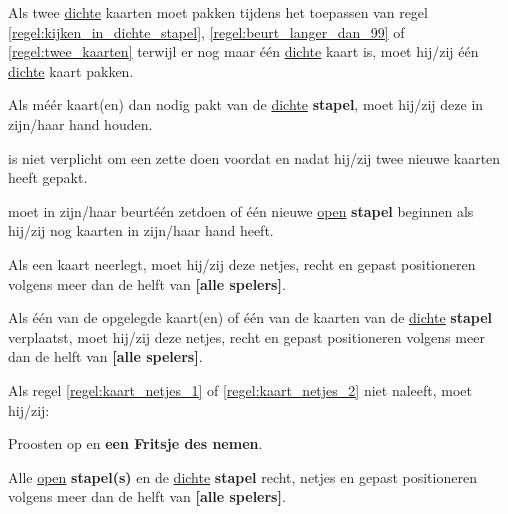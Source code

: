 \vervolgLijst{}
    \item Als \eenSpeler twee \ul{dichte} kaarten moet pakken tijdens het toepassen van regel \ref{regel:kijken_in_dichte_stapel}, \ref{regel:beurt_langer_dan_99} of \ref{regel:twee_kaarten} terwijl er nog maar \'e\'en \ul{dichte} kaart is, moet hij/zij \'e\'en \ul{dichte} kaart pakken.
    \label{item:geen_kaart_2}
\eindLijst{}

\vervolgLijst{}
    \item Als \eenSpeler méér kaart(en) dan nodig pakt van de \ul{dichte} \textbf{stapel}, moet hij/zij deze in zijn/haar hand houden.
\eindLijst{}

\vervolgLijst{}
    \item \EenSpeler is niet verplicht om een zet\footnotemark[3] te doen voordat en nadat hij/zij twee nieuwe kaarten heeft gepakt.
\eindLijst{}

\vervolgLijst{}
    \item \EenSpeler moet in zijn/haar beurt\footnotemark[1] \'e\'en zet\footnotemark[3] doen of \'e\'en nieuwe \ul{open} \textbf{stapel} beginnen als hij/zij nog kaarten in zijn/haar hand heeft.
\eindLijst{}


\newpage
{}


\vervolgLijst{}
    \item Als \eenSpeler een kaart neerlegt, moet hij/zij deze netjes, recht en gepast positioneren volgens meer dan de helft van \textbf{[alle spelers]}.
    \label{regel:kaart_netjes_1}
\eindLijst{}

\vervolgLijst{}
    \item Als \eenSpeler één van de opgelegde kaart(en) of één van de kaarten van de \ul{dichte} \textbf{stapel} verplaatst, moet hij/zij deze netjes, recht en gepast positioneren volgens meer dan de helft van \textbf{[alle spelers]}.
    \label{regel:kaart_netjes_2} 
\eindLijst{}

\vervolgLijst{}
    \item Als \eenSpeler regel \ref{regel:kaart_netjes_1} of \ref{regel:kaart_netjes_2} niet naleeft, moet hij/zij:
    \puntLijst{}
        \item Proosten op  en \textbf{een Fritsje des nemen}\footnotemark[1].
        \item Alle \ul{open} \textbf{stapel(s)} en de \ul{dichte} \textbf{stapel} recht, netjes en gepast positioneren volgens meer dan de helft van \textbf{[alle spelers]}. 
    \eindPuntLijst{}
\eindLijst{}

